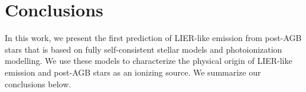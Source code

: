\documentclass[preprint2]{aastex62}
\begin{document}

\section{Conclusions}\label{sec:conclusions}

In this work, we present the first prediction of LIER-like emission from post-AGB stars that is based on fully self-consistent stellar models and photoionization modelling. We use these models to characterize the physical origin of LIER-like emission and post-AGB stars as an ionizing source. We summarize our conclusions below.
\end{document}
